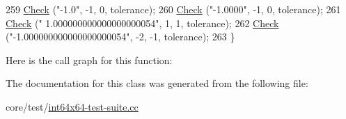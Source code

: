 \begin{DoxyCode}
259   \hyperlink{classns3_1_1int64x64_1_1test_1_1Int64x64InputTestCase_ae31646824694557747bd32f1a0e9b818}{Check} (\textcolor{stringliteral}{"-1.0"}, -1, 0, tolerance);
260   \hyperlink{classns3_1_1int64x64_1_1test_1_1Int64x64InputTestCase_ae31646824694557747bd32f1a0e9b818}{Check} (\textcolor{stringliteral}{"-1.0000"}, -1, 0, tolerance);
261   \hyperlink{classns3_1_1int64x64_1_1test_1_1Int64x64InputTestCase_ae31646824694557747bd32f1a0e9b818}{Check} (\textcolor{stringliteral}{" 1.000000000000000000054"},  1, 1, tolerance);
262   \hyperlink{classns3_1_1int64x64_1_1test_1_1Int64x64InputTestCase_ae31646824694557747bd32f1a0e9b818}{Check} (\textcolor{stringliteral}{"-1.000000000000000000054"}, -2, -1, tolerance);
263 \}
\end{DoxyCode}


Here is the call graph for this function\+:




The documentation for this class was generated from the following file\+:\begin{DoxyCompactItemize}
\item 
core/test/\hyperlink{int64x64-test-suite_8cc}{int64x64-\/test-\/suite.\+cc}\end{DoxyCompactItemize}
